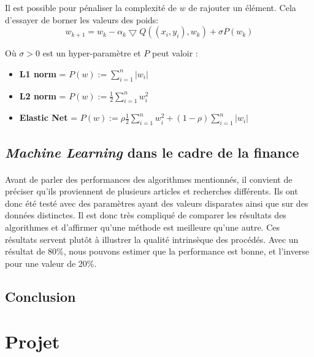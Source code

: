 \documentclass[a4paper, 11pt]{article}
\begin{document}
Il est possible pour pénaliser la complexité de $w$ de rajouter un élément. Cela d'essayer de borner les valeurs des poids:
$$w_{k+1} = w_k -\alpha_k \bigtriangledown Q ((x_i,y_i), w_k) + \sigma P(w_k)$$

Où $\sigma > 0$ est un hyper-paramètre et $P$ peut valoir :
\begin{itemize}
\item \textbf{L1 norm} = $P(w) := \sum\limits_{i=1}^n |w_i|$
\item \textbf{L2 norm} = $P(w) := \frac{1}{2}\sum\limits_{i=1}^n w_i^2$
\item \textbf{Elastic Net} = $P(w) := \rho \frac{1}{2}\sum\limits_{i=1}^n w_i^2 + (1 - \rho) \sum\limits_{i=1}^n |w_i|$
\end{itemize}


\subsection{\textit{Machine Learning} dans le cadre de la finance}
\paragraph{}
Avant de parler des performances des algorithmes mentionnés, il convient de préciser qu'ils proviennent de plusieurs articles et recherches différents. Ils ont donc été testé avec des paramètres ayant des valeurs disparates ainsi que sur des données distinctes.
Il est donc très compliqué de comparer les résultats des algorithmes et d'affirmer qu'une méthode est meilleure qu'une autre. Ces résultats servent plutôt à illustrer la qualité intrinsèque des procédés. Avec un résultat de 80\%, nous pouvons estimer que la performance est bonne, et l'inverse pour une valeur de 20\%.
\subsection{Conclusion}
\newpage
\section{Projet}
\newpage
\end{document}
